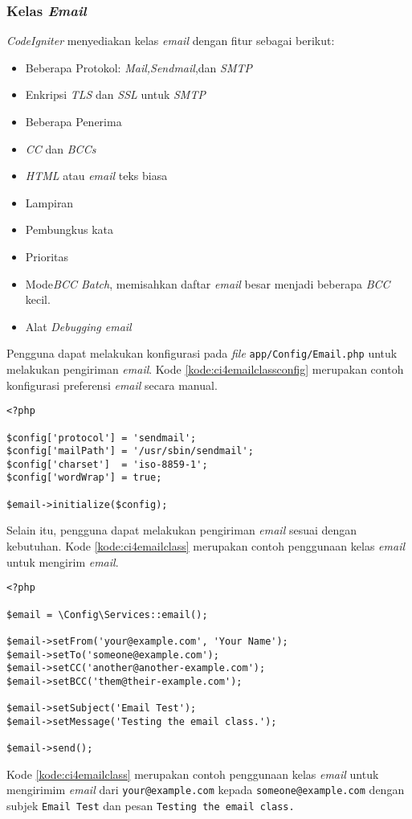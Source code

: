 \subsubsection{Kelas \textit{Email}}
\textit{CodeIgniter} menyediakan kelas \textit{email} dengan fitur sebagai berikut:
\begin{itemize}
\item Beberapa Protokol: \textit{Mail,Sendmail},dan \textit{SMTP}
\item Enkripsi \textit{TLS} dan \textit{SSL} untuk \textit{SMTP}
\item Beberapa Penerima
\item \textit{CC} dan \textit{BCCs}
\item \textit{HTML} atau \textit{email} teks biasa
\item Lampiran
\item Pembungkus kata
\item Prioritas
\item Mode\textit{BCC Batch}, memisahkan daftar \textit{email} besar menjadi beberapa \textit{BCC} kecil.
\item Alat \textit{Debugging email}
\end{itemize}

Pengguna dapat melakukan konfigurasi pada \textit{file} \verb|app/Config/Email.php| untuk melakukan pengiriman \textit{email}. Kode \ref{kode:ci4emailclassconfig} merupakan contoh konfigurasi preferensi \textit{email} secara manual.
 \begin{lstlisting}[caption=Contoh kode untuk melakukan konfigurasi \textit{email}. ,label=kode:ci4emailclassconfig]
<?php

$config['protocol'] = 'sendmail';
$config['mailPath'] = '/usr/sbin/sendmail';
$config['charset']  = 'iso-8859-1';
$config['wordWrap'] = true;

$email->initialize($config);
\end{lstlisting}

Selain itu, pengguna dapat melakukan pengiriman \textit{email} sesuai dengan kebutuhan. Kode \ref{kode:ci4emailclass} merupakan contoh penggunaan kelas \textit{email} untuk mengirim \textit{email}.
\begin{lstlisting}[caption=Contoh kode untuk melakukan pengiriman \textit{email}. ,label=kode:ci4emailclass]
<?php

$email = \Config\Services::email();

$email->setFrom('your@example.com', 'Your Name');
$email->setTo('someone@example.com');
$email->setCC('another@another-example.com');
$email->setBCC('them@their-example.com');

$email->setSubject('Email Test');
$email->setMessage('Testing the email class.');

$email->send();
\end{lstlisting}
Kode \ref{kode:ci4emailclass} merupakan contoh penggunaan kelas \textit{email} untuk mengirimim \textit{email} dari \texttt{your@example.com} kepada \texttt{someone@example.com} dengan subjek \texttt{Email Test} dan pesan \texttt{Testing the email class.}
